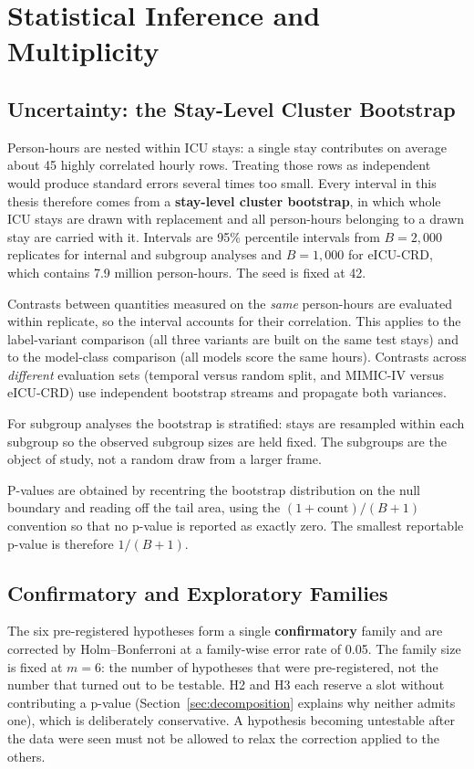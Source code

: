 \section{Statistical Inference and Multiplicity}
\label{sec:multiplicity}
\label{sec:inference}

\subsection{Uncertainty: the Stay-Level Cluster Bootstrap}

Person-hours are nested within ICU stays: a single stay contributes on average
about 45 highly correlated hourly rows. Treating those rows as independent
would produce standard errors several times too small. Every interval in this
thesis therefore comes from a \textbf{stay-level cluster bootstrap}, in which
whole ICU stays are drawn with replacement and all person-hours belonging to a
drawn stay are carried with it. Intervals are 95\% percentile intervals from
$B = 2{,}000$ replicates for internal and subgroup analyses and $B = 1{,}000$
for eICU-CRD, which contains 7.9 million person-hours. The seed is fixed at 42.

Contrasts between quantities measured on the \emph{same} person-hours are
evaluated within replicate, so the interval accounts for their correlation.
This applies to the label-variant comparison (all three variants are built on
the same test stays) and to the model-class comparison (all models score the
same hours). Contrasts across \emph{different} evaluation sets (temporal
versus random split, and MIMIC-IV versus eICU-CRD) use independent bootstrap
streams and propagate both variances.

For subgroup analyses the bootstrap is stratified: stays are resampled within
each subgroup so the observed subgroup sizes are held fixed. The subgroups are
the object of study, not a random draw from a larger frame.

P-values are obtained by recentring the bootstrap distribution on the null
boundary and reading off the tail area, using the $(1 + \text{count})/(B + 1)$
convention so that no p-value is reported as exactly zero. The smallest
reportable p-value is therefore $1/(B+1)$.

\subsection{Confirmatory and Exploratory Families}

The six pre-registered hypotheses form a single \textbf{confirmatory} family
and are corrected by Holm--Bonferroni at a family-wise error rate of 0.05. The
family size is fixed at $m = 6$: the number of hypotheses that were
pre-registered, not the number that turned out to be testable. H2 and H3 each
reserve a slot without contributing a p-value (Section~\ref{sec:decomposition}
explains why neither admits one), which is deliberately conservative. A
hypothesis becoming untestable after the data were seen must not be allowed to
relax the correction applied to the others.

